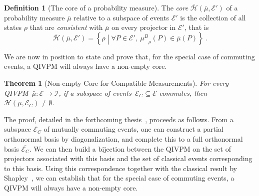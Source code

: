 \documentclass[english,reprint, aps, prl,superscriptaddress, showpacs,
showkeys, longbibliography, amsmath, amssymb, floatfix]{revtex4-1}
\theoremstyle{plain}
\newtheorem{thm}{Theorem}
\theoremstyle{definition}
\newtheorem{definition}{Definition}
\newcommand{\Hilb}{\mathcal{H}}
\newcommand{\events}{\ensuremath{\mathcal{E}}}
\newcommand{\set}[2]{\ensuremath{\left\{ {#1}\mathrel{}\middle|\mathrel{}{#2}\right\} }}
\newcommand{\coreBorn}{\ensuremath{\overline{\Hilb}}}
\newcommand{\muB}{\ensuremath{\mu^{B}}}
\newcommand{\eventsC}{\ensuremath{\events_{C}}}
\begin{document}
\begin{definition}[The core of a probability measure] The \emph{core}
$\coreBorn\left(\bar{\mu},\events'\right)$ of a probability measure 
$\bar{\mu}$ relative to a subspace of events $\events'$ is the
collection of all states $\rho$ that are \emph{consistent} with 
$\bar{\mu}$ on every projector in $\events'$, that is
\begin{equation}
\label{eq:hbar}
\coreBorn\left(\bar{\mu},\events'\right) = \set{\rho}{\forall P\in
\events',~\muB_{\rho}\left(P\right)\in\bar{\mu}\left(P\right)} \ .
\end{equation}
\end{definition}

We are now in position to state and prove that, for the special case
of commuting events, a QIVPM will always have a non-empty core.

\begin{thm}[Non-empty Core for Compatible Measurements] \label{thm:Shapley}
  For every QIVPM~$\bar{\mu}:\events\rightarrow\mathscr{I}$, if a subspace
  of events~$\eventsC\subseteq\events$ commutes, then
  $\coreBorn\left(\bar{\mu},\eventsC\right)\ne\emptyset$.
\end{thm}

The proof, detailed in the forthcoming thesis~\cite{TaiThesis2018}, proceeds as
follows. From a subspace $\eventsC$ of mutually commuting events, one
can construct a partial orthonormal basis by diagonalization, and
complete this to a full orthonormal basis $\overline{\eventsC}$.  We
can then build a bijection between the QIVPM on the set of projectors
associated with this basis and the set of classical events
corresponding to this basis.  Using this correspondence together with
the classical result by
Shapley~\cite{Shapley1971,GilboaSchmeidler1994,NgMoYeh1997,Grabisch2016},
we can establish that for the special case of commuting events, a
QIVPM will always have a non-empty core.
\end{document}
